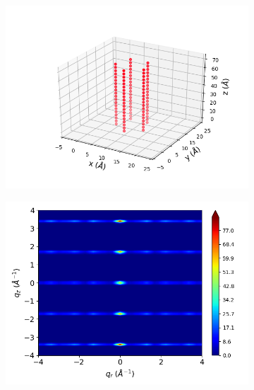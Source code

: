 \documentclass[journal=jpcbfk,manusciprt=article]{achemso}
\begin{document}
  \begin{figure}[!htb]
  \centering
  \begin{subfigure}{0.45\textwidth}
  \includegraphics[width=\textwidth]{simple_sandwich_realspace.png}
  \caption{}\label{fig:simple_sandwich_realspace}
  \end{subfigure}
  \begin{subfigure}{0.45\textwidth}
  \includegraphics[width=\textwidth]{simple_sandwich_rzplot.png}
  \caption{}\label{fig:simple_sandwich_rzplot}
  \end{subfigure}
  \begin{subfigure}{0.45\textwidth}

\end{subfigure}
\end{figure}
\end{document}
